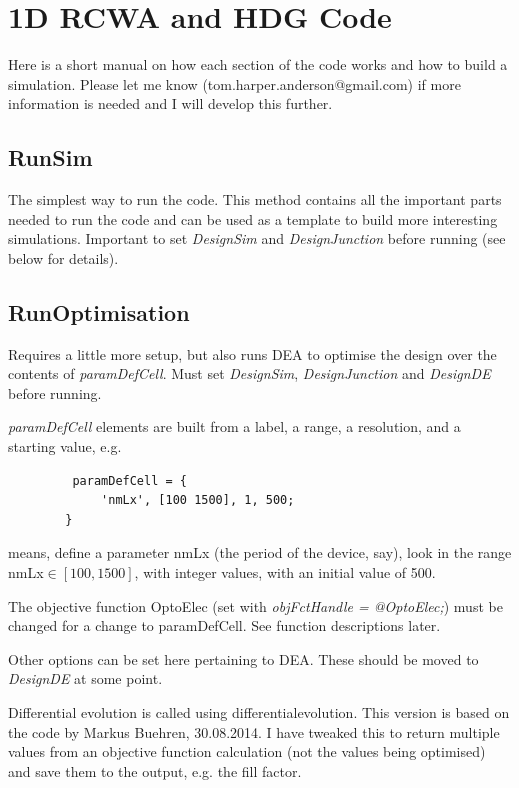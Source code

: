 \documentclass[]{article}  %
\begin{document}
\section{1D RCWA and HDG Code}

Here is a short manual on how each section of the code works and how to build a simulation. Please let me know (tom.harper.anderson@gmail.com) if more information is needed and I will develop this further.

	\subsection{RunSim}
	
The simplest way to run the code. This method contains all the important parts needed to run the code and can be used as a template to build more interesting simulations. Important to set \emph{DesignSim} and \emph{DesignJunction} before running (see below for details).

	\subsection{RunOptimisation}
	
	Requires a little more setup, but also runs DEA to optimise the design over the contents of \emph{paramDefCell}. Must set \emph{DesignSim}, \emph{DesignJunction} and \emph{DesignDE} before running.
	
	\emph{paramDefCell} elements are built from a label, a range, a resolution, and a starting value, e.g. 
	\begin{verbatim}
		 paramDefCell = {
			 'nmLx', [100 1500], 1, 500;
		}
	\end{verbatim}
	means, define a parameter nmLx (the period of the device, say), look in the range nmLx$\in[100, 1500]$, with integer values, with an initial value of 500.
	
	The objective function OptoElec (set with \emph{objFctHandle = @OptoElec;}) must be changed for a change to paramDefCell. See function descriptions later.
	
	Other options can be set here pertaining to DEA. These should be moved to \emph{DesignDE} at some point.
	
	Differential evolution is called using differentialevolution. This version is based on the code by Markus Buehren, 30.08.2014. I have tweaked this to return multiple values from an objective function calculation (not the values being optimised) and save them to the output, e.g. the fill factor.
	
\end{document}
